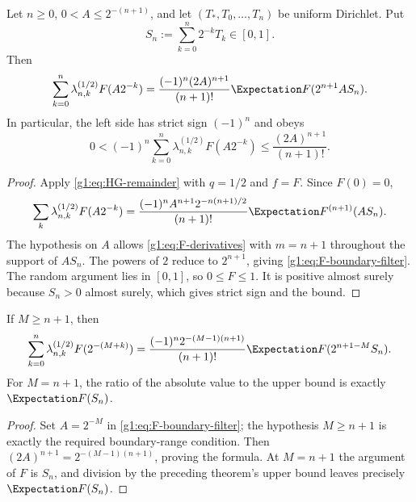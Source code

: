 \begin{theorem}
Let $n\ge0$, $0<A\le2^{-(n+1)}$, and let
$(T_*,T_0,\ldots,T_n)$ be uniform Dirichlet.  Put
\begin{equation}
 S_n:=\sum_{k=0}^n2^{-k}T_k\in[0,1].
 \label{g1:eq:Sn}
\end{equation}
Then
\begin{equation}
 \sum_{k=0}^n\lambda_{n,k}^{(1/2)}F(A2^{-k})
 =\frac{(-1)^n(2A)^{n+1}}{(n+1)!}
 \Expectation F(2^{n+1}AS_n).
 \label{g1:eq:F-boundary-filter}
\end{equation}
In particular, the left side has strict sign $(-1)^n$ and obeys
\begin{equation}
 0<(-1)^n\sum_{k=0}^n\lambda_{n,k}^{(1/2)}F(A2^{-k})
 \le\frac{(2A)^{n+1}}{(n+1)!}.
 \label{g1:eq:F-boundary-bound}
\end{equation}
\end{theorem}

\begin{proof}
Apply \eqref{g1:eq:HG-remainder} with $q=1/2$ and $f=F$.  Since $F(0)=0$,
\[
 \sum_k\lambda_{n,k}^{(1/2)}F(A2^{-k})
 =\frac{(-1)^nA^{n+1}2^{-n(n+1)/2}}{(n+1)!}
 \Expectation F^{(n+1)}(AS_n).
\]
The hypothesis on $A$ allows \eqref{g1:eq:F-derivatives} with $m=n+1$ throughout
the support of $AS_n$.  The powers of $2$ reduce to $2^{n+1}$, giving
\eqref{g1:eq:F-boundary-filter}.  The random argument lies in $[0,1]$, so
$0\le F\le1$.  It is positive almost surely because $S_n>0$ almost surely,
which gives strict sign and the bound.
\end{proof}

\begin{corollary}
If $M\ge n+1$, then
\begin{equation}
 \sum_{k=0}^n\lambda_{n,k}^{(1/2)}F(2^{-(M+k)})
 =\frac{(-1)^n2^{-(M-1)(n+1)}}{(n+1)!}
 \Expectation F(2^{n+1-M}S_n).
 \label{g1:eq:F-dyadic-filter}
\end{equation}
For $M=n+1$, the ratio of the absolute value to the upper bound is exactly
$\Expectation F(S_n)$.
\end{corollary}

\begin{proof}
Set $A=2^{-M}$ in \cref{g1:eq:F-boundary-filter}; the hypothesis
$M\ge n+1$ is exactly the required boundary-range condition.  Then
$(2A)^{n+1}=2^{-(M-1)(n+1)}$, proving the formula.  At $M=n+1$ the
argument of $F$ is $S_n$, and division by the preceding theorem's upper
bound leaves precisely $\Expectation F(S_n)$.
\end{proof}

